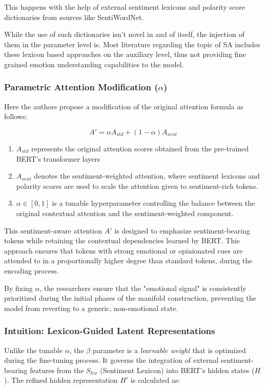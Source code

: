 \documentclass[a4paper,12pt]{article}
\begin{document}
This happens with the help of external sentiment lexicons and polarity score dictionaries from sources like SentiWordNet. 

While the use of such dictionaries isn't novel in and of itself, the injection of them in the parameter level is. Most literature regarding the topic of SA includes these lexicon based approaches on the auxiliary level, thus not providing fine grained emotion understanding capabilities to the model.

\subsubsection{Parametric Attention Modification ($\alpha$)}
Here the authors propose a modification of the original attention formula as follows;

\begin{equation}
    A' = \alpha A_{std} + (1 - \alpha)A_{sent}
\end{equation}

\begin{enumerate}
    \item $A_{std}$ represents the original attention scores obtained from the pre-trained BERT's transformer layers
    \item $A_{sent}$ denotes the sentiment-weighted attention, where sentiment lexicons and polarity scores are used to scale the attention given to sentiment-rich tokens.
    \item $\alpha \in [0, 1]$ is a tunable hyperparameter controlling the balance between the original contextual attention and the sentiment-weighted component.
\end{enumerate}

This sentiment-aware attention $A'$ is designed
to emphasize sentiment-bearing tokens while retaining the contextual dependencies learned by BERT. This approach ensures that tokens with strong emotional or opinionated cues are attended to in a proportionally higher degree than standard tokens, during the encoding process.

By fixing $\alpha$, the researchers ensure that the "emotional signal" is consistently prioritized during the initial phases of the manifold construction, preventing the model from reverting to a generic, non-emotional state.

\subsubsection{Intuition: Lexicon-Guided Latent Representations}
Unlike the tunable $\alpha$, the $\beta$ parameter is a \textit{learnable weight} that is optimized during the fine-tuning process. It governs the integration of external sentiment-bearing features from the $S_{lex}$ (Sentiment Lexicon) into BERT's hidden states ($H$). The refined hidden representation $H'$ is calculated as:
\end{document}
